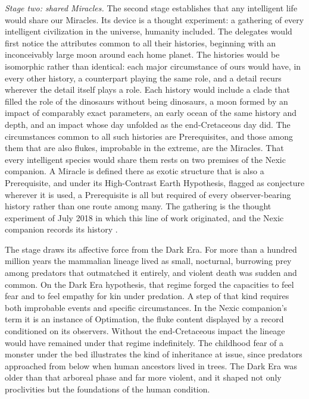 \emph{Stage two: shared Miracles.} The second stage establishes that any
intelligent life would share our Miracles. Its device is a thought
experiment: a gathering of every intelligent civilization in the universe,
humanity included. The delegates would first notice the attributes common to
all their histories, beginning with an inconceivably large moon around each
home planet. The histories would be isomorphic rather than identical: each
major circumstance of ours would have, in every other history, a counterpart
playing the same role, and a detail recurs wherever the detail itself
plays a role. Each history would include a clade that filled the
role of the dinosaurs without being dinosaurs, a moon formed by an impact of
comparably exact parameters, an early ocean of the same history and depth,
and an impact whose day unfolded as the end-Cretaceous day did. The
circumstances common to all such histories are Prerequisites, and those
among them that are also flukes, improbable in the extreme, are the
Miracles. That every intelligent species would share them rests on two
premises of the Nexic companion. A Miracle is defined there as exotic
structure that is also a Prerequisite, and under its High-Contrast Earth
Hypothesis, flagged as conjecture wherever it is used, a Prerequisite is all
but required of every observer-bearing history rather than one route among
many. The gathering is the thought experiment of July 2018 in which this
line of work originated, and the Nexic companion records its history
\cite{Nexus}.

The stage draws its affective force from the Dark Era. For more than a
hundred million years the mammalian lineage lived as small, nocturnal,
burrowing prey among predators that outmatched it entirely, and violent
death was sudden and common. On the Dark Era hypothesis, that regime forged
the capacities to feel fear and to feel empathy for kin under predation. A
step of that kind requires both improbable events and specific
circumstances. In the Nexic companion's term it is an instance of
Optimation, the fluke content displayed by a record conditioned on its
observers. Without the end-Cretaceous impact the lineage would have remained
under that regime indefinitely. The childhood fear of a monster under the
bed illustrates the kind of inheritance at issue, since predators approached
from below when human ancestors lived in trees. The Dark Era was older than
that arboreal phase and far more violent, and it shaped not only
proclivities but the foundations of the human condition.


